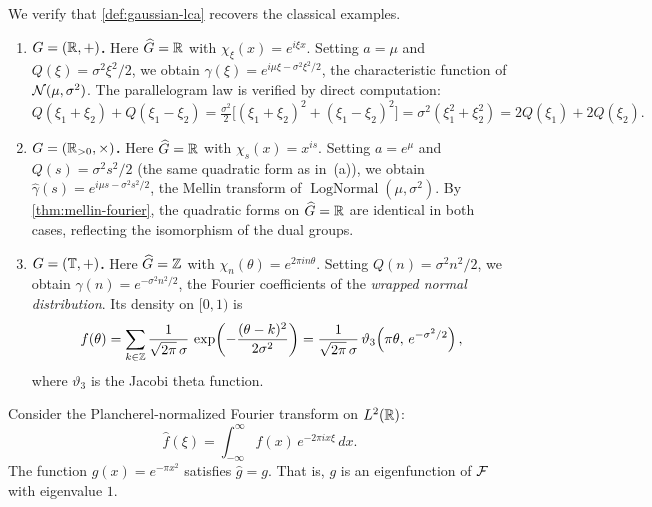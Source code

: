 \begin{example}\label{ex:gaussian-instances}
We verify that \cref{def:gaussian-lca} recovers the classical examples.
\begin{enumerate}[label=(\alph*)]
\item \textbf{$G = (\mathbb{R}, +)$.} Here $\widehat{G} = \mathbb{R}$ with $\chi_\xi(x) = e^{i\xi x}$. Setting $a = \mu$ and $Q(\xi) = \sigma^2\xi^2/2$, we obtain $\widehat{\gamma}(\xi) = e^{i\mu\xi - \sigma^2\xi^2/2}$, the characteristic function of $\mathcal{N}(\mu, \sigma^2)$. The parallelogram law is verified by direct computation:
\[
Q(\xi_1 + \xi_2) + Q(\xi_1 - \xi_2) = \tfrac{\sigma^2}{2}\bigl[(\xi_1+\xi_2)^2 + (\xi_1-\xi_2)^2\bigr] = \sigma^2(\xi_1^2 + \xi_2^2) = 2Q(\xi_1) + 2Q(\xi_2).
\]

\item \textbf{$G = (\mathbb{R}_{>0}, \times)$.} Here $\widehat{G} = \mathbb{R}$ with $\chi_s(x) = x^{is}$. Setting $a = e^\mu$ and $Q(s) = \sigma^2 s^2/2$ (the same quadratic form as in~(a)), we obtain $\widehat{\gamma}(s) = e^{i\mu s - \sigma^2 s^2/2}$, the Mellin transform of $\operatorname{LogNormal}(\mu, \sigma^2)$. By \cref{thm:mellin-fourier}, the quadratic forms on $\widehat{G} = \mathbb{R}$ are identical in both cases, reflecting the isomorphism of the dual groups.

\item \textbf{$G = (\mathbb{T}, +)$.} Here $\widehat{G} = \mathbb{Z}$ with $\chi_n(\theta) = e^{2\pi i n\theta}$. Setting $Q(n) = \sigma^2 n^2/2$, we obtain $\widehat{\gamma}(n) = e^{-\sigma^2 n^2/2}$, the Fourier coefficients of the \emph{wrapped normal distribution}. Its density on $[0, 1)$ is
\[
f(\theta) = \sum_{k \in \mathbb{Z}} \frac{1}{\sqrt{2\pi}\,\sigma}\, \exp\!\left(-\frac{(\theta - k)^2}{2\sigma^2}\right) = \frac{1}{\sqrt{2\pi}\,\sigma}\,\vartheta_3\!\left(\pi\theta,\, e^{-\sigma^2/2}\right),
\]
where $\vartheta_3$ is the Jacobi theta function.
\end{enumerate}
\end{example}

\begin{theorem}\label{thm:gaussian-fixed}
Consider the Plancherel-normalized Fourier transform on $L^2(\mathbb{R})$:
\[
\hat{f}(\xi) = \int_{-\infty}^{\infty} f(x)\, e^{-2\pi i x\xi}\, dx.
\]
The function $g(x) = e^{-\pi x^2}$ satisfies $\hat{g} = g$. That is, $g$ is an eigenfunction of $\mathcal{F}$ with eigenvalue $1$.
\end{theorem}

